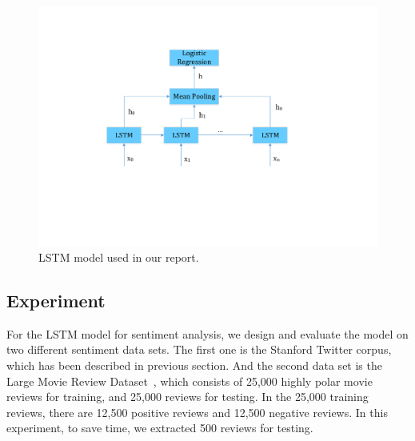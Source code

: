 \begin{figure}
\centering
\includegraphics[scale=0.5]{figure/lstm_model.pdf}
\caption{LSTM model used in our report.}
\label{fig:lstm_model}
\end{figure}

\subsection{Experiment}


For the LSTM model for sentiment analysis, we design and evaluate the model on two different sentiment data sets. The first one is the Stanford Twitter corpus, which has been described in previous section. And the second data set is the Large Movie Review Dataset~\cite{maas2011}, which consists of 25,000 highly polar movie reviews for training, and 25,000 reviews for testing. In the 25,000 training reviews, there are 12,500 positive reviews and 12,500 negative reviews. In this experiment, to save time, we extracted 500 reviews for testing.


